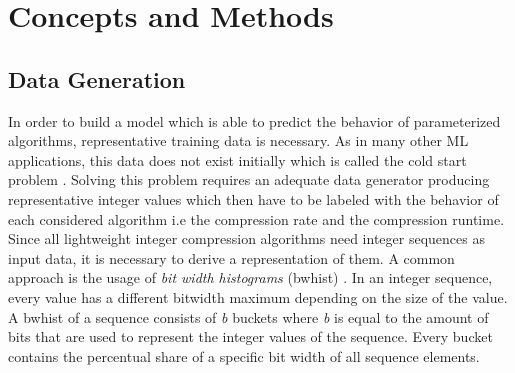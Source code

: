 \chapter{Concepts and Methods}
\label{chap:concepts_and_methods}
\section{Data Generation}
In order to build a model which is able to predict the behavior of parameterized algorithms, representative training data is necessary. As in many other ML applications, this data does not exist initially which is called the cold start problem \cite{Woltmann2021}. Solving this problem requires an adequate data generator producing representative integer values which then have to be labeled with the behavior of each considered algorithm i.e the compression rate and the compression runtime. Since all lightweight integer compression algorithms need integer sequences as input data, it is necessary to derive a representation of them. A common approach is the usage of \emph{bit width histograms} (bwhist) \cite{Damme2020, Woltmann2021}. In an integer sequence, every value has a different bitwidth maximum depending on the size of the value. A bwhist of a sequence consists of \emph{b} buckets where \emph{b} is equal to the amount of bits that are used to represent the integer values of the sequence. Every bucket contains the percentual share of a specific bit width of all sequence elements.

